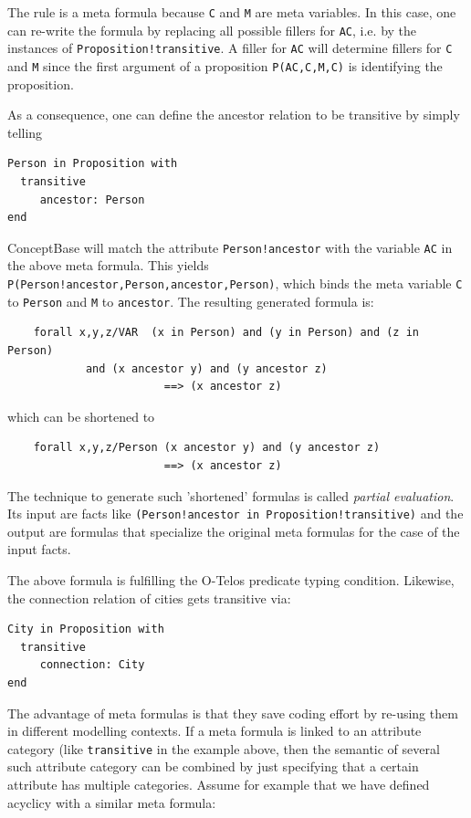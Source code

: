 The rule is a meta formula because {\tt C} and {\tt M} are meta variables. In this case, one
can re-write the formula by replacing all possible fillers for {\tt AC}, i.e. by the instances
of {\tt Proposition!transitive}. A filler for {\tt AC} will determine fillers for {\tt C} and
{\tt M} since the first argument of a proposition {\tt P(AC,C,M,C)} is identifying the proposition.

As a consequence, one can define the ancestor relation to be transitive by simply telling

\begin{verbatim}
Person in Proposition with
  transitive
     ancestor: Person
end
\end{verbatim}

ConceptBase will match the attribute {\tt Person!ancestor} with the variable {\tt AC} in 
the above meta formula. This yields {\tt P(Person!ancestor,Person,ancestor,Person)},
which binds the meta variable {\tt C} to {\tt Person} and {\tt M} to {\tt ancestor}.
The resulting generated formula is:

\begin{verbatim}
    forall x,y,z/VAR  (x in Person) and (y in Person) and (z in Person)
            and (x ancestor y) and (y ancestor z)
                        ==> (x ancestor z)
\end{verbatim}

which can be shortened to

\begin{verbatim}
    forall x,y,z/Person (x ancestor y) and (y ancestor z)
                        ==> (x ancestor z)
\end{verbatim}

The technique to generate such 'shortened' formulas is called {\em partial evaluation}.
Its input are facts like {\tt (Person!ancestor in Proposition!transitive)} and
the output are formulas that specialize the original meta formulas for the case
of the input facts.

The above formula is fulfilling the O-Telos predicate typing condition. 
Likewise, the connection relation of cities gets transitive via:

\begin{verbatim}
City in Proposition with
  transitive
     connection: City
end
\end{verbatim}

The advantage of meta formulas is that they save coding effort by re-using them in
different modelling contexts. If a meta formula is linked to an attribute category
(like {\tt transitive} in the example above, then the semantic of several such
attribute category can be combined by just specifying that a certain attribute
has multiple categories. Assume for example that we have defined acyclicy with a 
similar meta formula:

